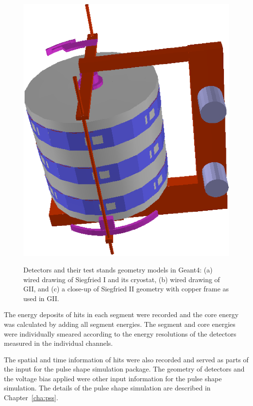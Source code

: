 \begin{figure}[tbhp]
{\includegraphics[height=0.3\textheight,clip]{SIIsolid}}
\caption{Detectors and their test stands geometry models in Geant4: (a) wired drawing of Siegfried I and its cryostat, (b) wired drawing of GII, and (c) a close-up of Siegfried II geometry with copper frame as used in GII.}
\label{fig:ph:sim}
\end{figure}

The energy deposits of hits in each segment were recorded and the core energy was calculated by adding all segment energies. The segment and core energies were individually smeared according to the energy resolutions of the detectors measured in the individual channels.

The spatial and time information of hits were also recorded and served as parts of the input for the pulse shape simulation package. The geometry of detectors and the voltage bias applied were other input information for the pulse shape simulation. The details of the pulse shape simulation are described in Chapter~\ref{cha:pss}.


